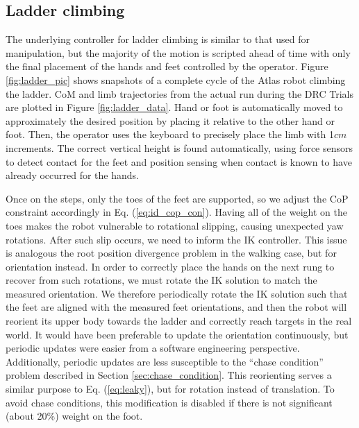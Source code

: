 \documentclass{ws-ijhr}
\newcommand{\eref}[1] {Eq. (\ref{#1})}
\newcommand{\fref}[1] {Figure \ref{#1}}
\newcommand{\sref}[1] {Section \ref{#1}}
\begin{document}
\subsection{Ladder climbing}
The underlying controller for ladder climbing is similar to that used for 
manipulation, but the majority of the motion is scripted ahead of time with 
only the final placement of the hands and feet controlled by the operator. 
\fref{fig:ladder_pic} shows snapshots of a complete cycle of the Atlas robot
climbing the ladder. 
CoM and limb trajectories from the actual run during the DRC Trials are plotted 
in \fref{fig:ladder_data}. 
Hand or foot is automatically moved to approximately the 
desired position by placing it relative to the other hand or foot. Then, 
the operator uses the keyboard to precisely place the limb with 1$cm$ 
increments. The correct vertical height is found automatically, using force 
sensors to detect contact for the feet and position sensing when contact is 
known to have already occurred for the hands.

Once on the steps, only the toes of the feet are supported, so we adjust the 
CoP constraint accordingly in \eref{eq:id_cop_con}. Having all of the weight on the toes makes the 
robot vulnerable to rotational slipping, causing unexpected yaw rotations.
After such slip occurs, we need to inform the IK controller. 
This issue is analogous the root position divergence problem in the walking case, 
but for orientation instead.
In order to correctly place the hands on the next rung to recover from such 
rotations, we must rotate the IK solution to match the measured orientation.  
We therefore periodically rotate the IK solution such that the feet are aligned 
with the measured feet orientations, and then the robot will reorient its 
upper body towards the ladder and correctly reach targets in the real world.  
It would have been preferable to update the orientation continuously, but 
periodic updates were easier from a software engineering perspective.  
Additionally, periodic updates are less susceptible to the ``chase 
condition'' problem described in \sref{sec:chase_condition}. 
This reorienting serves a similar purpose 
to \eref{eq:leaky}, but for rotation instead of translation. 
To avoid chase conditions, this modification is disabled if there is not 
significant (about 20\%) weight on the foot.
\end{document}
